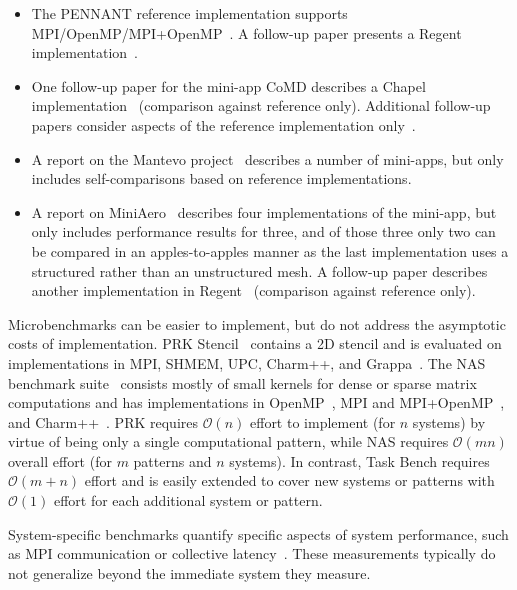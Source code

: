 \begin{itemize}

\item
The PENNANT reference implementation supports
MPI/OpenMP/MPI+OpenMP~\cite{PENNANT}. A follow-up paper presents a
Regent implementation~\cite{Regent15}.

\item
One follow-up paper for the mini-app CoMD describes a Chapel
implementation~\cite{CoMDChapel16} (comparison against reference
only). Additional follow-up papers consider aspects of the reference
implementation only~\cite{CoMDLoadImbalance17,
  CoMDThreadedModels14}.

\item
A report on the Mantevo project~\cite{Mantevo09} describes a number of
mini-apps, but only includes self-comparisons based on reference
implementations.

\item
A report on MiniAero~\cite{SandiaReportManyTaskRuntimes15} describes
four implementations of the mini-app, but only includes performance
results for three, and of those three only two can be compared in an
apples-to-apples manner as the last implementation uses a structured
rather than an unstructured mesh. A follow-up paper describes another
implementation in Regent~\cite{Regent15} (comparison against reference
only).

\end{itemize}

Microbenchmarks can be easier to implement, but do not address the
asymptotic costs of implementation. PRK Stencil~\cite{PRK14} contains a
2D stencil and is evaluated on implementations in MPI, SHMEM, UPC,
Charm++, and Grappa~\cite{PRKRuntimes16}. The NAS benchmark
suite~\cite{NAS91, NAS95} consists mostly of small kernels for dense
or sparse matrix computations and has implementations in
OpenMP~\cite{NASOpenMP99}, MPI and MPI+OpenMP~\cite{NASMPIOpenMP00},
and Charm++~\cite{NASCharm96}. PRK requires $\mathcal{O}(n)$ effort to
implement (for $n$ systems) by virtue of being only a single
computational pattern, while NAS requires $\mathcal{O}(mn)$ overall
effort (for $m$ patterns and $n$ systems). In contrast, Task Bench
requires $\mathcal{O}(m+n)$ effort and is easily extended to cover new
systems or patterns with $\mathcal{O}(1)$ effort for each additional
system or pattern.

System-specific benchmarks quantify specific aspects
of system performance, such as MPI communication or collective
latency~\cite{MPPTest99, MPIBench01}. These measurements typically do
not generalize beyond the immediate system they measure.

